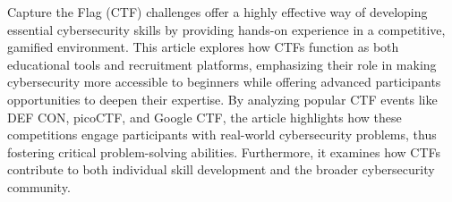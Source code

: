 \documentclass[conference]{IEEEtran}
\begin{document}
Capture the Flag (CTF) challenges offer a highly effective way of developing
essential cybersecurity skills by providing hands-on experience in a
competitive, gamified environment. This article explores how CTFs function as
both educational tools and recruitment platforms, emphasizing their role in
making cybersecurity more accessible to beginners while offering advanced
participants opportunities to deepen their expertise. By analyzing popular CTF
events like DEF CON, picoCTF, and Google CTF, the article highlights how these
competitions engage participants with real-world cybersecurity problems, thus
fostering critical problem-solving abilities. Furthermore, it examines how CTFs
contribute to both individual skill development and the broader cybersecurity
community.



\end{document}

